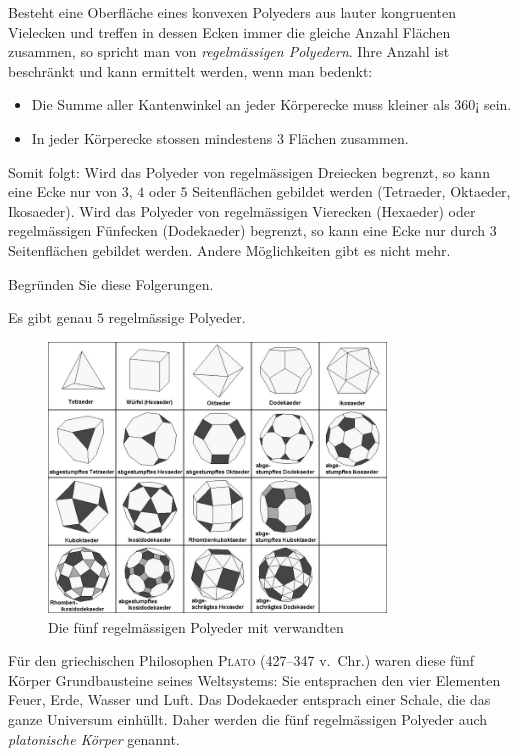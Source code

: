 \documentclass[%
11pt,%
twoside,%
titlepage,%
a4page,%
german,%
headsepline%
]{scrartcl}
\begin{document}
Besteht eine Oberfl\"ache eines konvexen Polyeders aus lauter kongruenten Vielecken und treffen in dessen Ecken immer die gleiche Anzahl Fl\"achen zusammen, so spricht man von \emph{regelm\"assigen Polyedern}. Ihre Anzahl ist beschr\"ankt und kann ermittelt werden, wenn man bedenkt:
\begin{itemize}
\item Die Summe aller Kantenwinkel an jeder K\"orperecke muss kleiner als $360¡$ sein.
\item In jeder K\"orperecke stossen mindestens $3$ Fl\"achen zusammen.
\end{itemize}
Somit folgt: Wird das Polyeder von regelm\"assigen Dreiecken begrenzt, so kann eine Ecke nur von $3$, $4$ oder $5$ Seitenfl\"achen gebildet werden (Tetraeder, Oktaeder, Ikosaeder). Wird das Polyeder von regelm\"assigen Vierecken (Hexaeder) oder regelm\"assigen F\"unfecken (Dodekaeder) begrenzt, so kann eine Ecke nur durch $3$ Seitenfl\"achen gebildet werden. Andere M\"oglichkeiten gibt es nicht mehr.
\begin{ueb}
Begr\"unden Sie diese Folgerungen.
\end{ueb}
\begin{satz}
Es gibt genau $5$ regelm\"assige Polyeder.
\end{satz}

\begin{figure}[h!]
\begin{center}
\includegraphics[width=0.8\textwidth]{pictures/polyeders}
\end{center}
\caption{Die f\"unf regelm\"assigen Polyeder mit verwandten}
\end{figure}

F\"ur den griechischen Philosophen \textsc{Plato} (427--347 v.~Chr.) waren diese f\"unf K\"orper Grundbausteine seines Weltsystems: Sie entsprachen den vier Elementen Feuer, Erde, Wasser und Luft. Das Dodekaeder entsprach einer Schale, die das ganze Universum einh\"ullt. Daher werden die f\"unf regelm\"assigen Polyeder auch \emph{platonische K\"orper} genannt.
\end{document}
